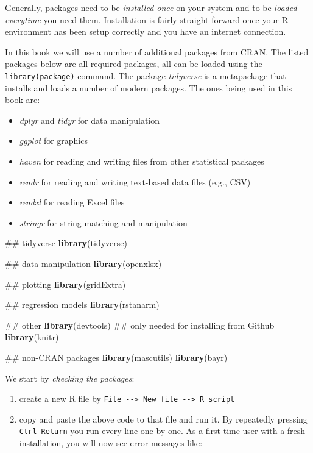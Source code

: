 \documentclass[]{svmono}
\newenvironment{Shaded}{\begin{snugshade}}{\end{snugshade}}
\newcommand{\KeywordTok}[1]{\textcolor[rgb]{0.13,0.29,0.53}{\textbf{#1}}}
\newcommand{\NormalTok}[1]{#1}
\providecommand{\tightlist}{%
  \setlength{\itemsep}{0pt}\setlength{\parskip}{0pt}}
\begin{document}
Generally, packages need to be \emph{installed once} on your system and
to be \emph{loaded everytime} you need them. Installation is fairly
straight-forward once your R environment has been setup correctly and
you have an internet connection.

In this book we will use a number of additional packages from CRAN. The
listed packages below are all required packages, all can be loaded using
the \texttt{library(package)} command. The package \emph{tidyverse} is a
metapackage that installs and loads a number of modern packages. The
ones being used in this book are:

\begin{itemize}
\tightlist
\item
  \emph{dplyr} and \emph{tidyr} for data manipulation
\item
  \emph{ggplot} for graphics
\item
  \emph{haven} for reading and writing files from other statistical
  packages
\item
  \emph{readr} for reading and writing text-based data files (e.g., CSV)
\item
  \emph{readxl} for reading Excel files
\item
  \emph{stringr} for string matching and manipulation
\end{itemize}

\begin{Shaded}
\begin{Highlighting}[]
\NormalTok{## tidyverse}
\KeywordTok{library}\NormalTok{(tidyverse)}

\NormalTok{## data manipulation}
\KeywordTok{library}\NormalTok{(openxlsx)}

\NormalTok{## plotting}
\KeywordTok{library}\NormalTok{(gridExtra)}

\NormalTok{## regression models}
\KeywordTok{library}\NormalTok{(rstanarm)}

\NormalTok{## other}
\KeywordTok{library}\NormalTok{(devtools) ## only needed for installing from Github}
\KeywordTok{library}\NormalTok{(knitr)}

\NormalTok{## non-CRAN packages}
\KeywordTok{library}\NormalTok{(mascutils)}
\KeywordTok{library}\NormalTok{(bayr)}
\end{Highlighting}
\end{Shaded}

We start by \emph{checking the packages}:

\begin{enumerate}
\def\labelenumi{\arabic{enumi}.}
\tightlist
\item
  create a new R file by
  \texttt{File\ -\/-\textgreater{}\ New\ file\ -\/-\textgreater{}\ R\ script}
\item
  copy and paste the above code to that file and run it. By repeatedly
  pressing \texttt{Ctrl-Return} you run every line one-by-one. As a
  first time user with a fresh installation, you will now see error
  messages like:
\end{enumerate}
\end{document}
